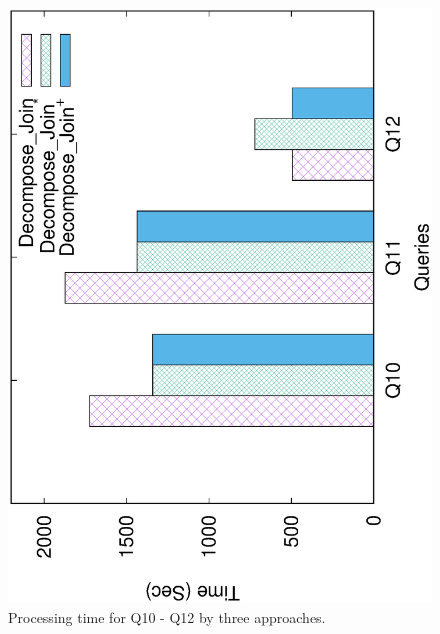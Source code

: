 \begin{figure}[H]
	\centering
	\includegraphics[scale=0.43, angle=270]{plot/threeall.eps}
	\caption{Processing time for Q10 - Q12 by three approaches.}
	\label{fig:threeall}
\end{figure}


